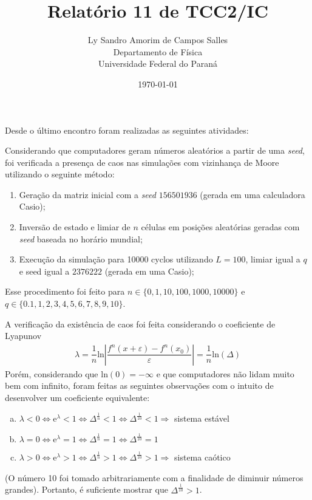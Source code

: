 \documentclass[12pt,a4paper,final]{article}
\title{Relatório 11 de TCC2/IC}
\author{Ly Sandro Amorim de Campos Salles\\Departamento de Física\\Universidade Federal do Paraná}
\date{\today}
\begin{document}
	\maketitle

  Desde o último encontro foram realizadas as seguintes atividades:

  Considerando que computadores geram números aleatórios a partir de uma \textit{seed}, foi verificada a presença de caos nas simulações com vizinhança de Moore utilizando o seguinte método:
  \begin{enumerate}
    \item Geração da matriz inicial com a \textit{seed} $156501936$ (gerada em uma calculadora Casio);
    \item Inversão de estado e limiar de $n$ células em posições aleatórias geradas com \textit{seed} baseada no horário mundial;
    \item Execução da simulação para 10000 cyclos utilizando $L=100$, limiar igual a $q$ e seed igual a $2376222$ (gerada em uma Casio);
  \end{enumerate}
  Esse procedimento foi feito para $n\in\{0, 1, 10, 100, 1000, 10000\}$ e $q\in\{0.1, 1, 2, 3, 4, 5, 6, 7, 8, 9, 10\}$.

  A verificação da existência de caos foi feita considerando o coeficiente de Lyapunov
  \begin{align}
    \lambda = \dfrac{1}{n} \mathrm{ln}\left|\dfrac{f^n(x+\varepsilon) - f^n(x_0)}{\varepsilon}\right| = \dfrac{1}{n} \mathrm{ln}(\Delta)
  \end{align}
  Porém, considerando que $\mathrm{ln}(0)=-\infty$ e que computadores não lidam muito bem com infinito, foram feitas as seguintes observações com o intuito de desenvolver um coeficiente equivalente:
  \begin{enumerate}[a)]
    \item $\lambda < 0 \Leftrightarrow \mathrm{e}^\lambda < 1 \Leftrightarrow \Delta^\frac{1}{n} < 1 \Leftrightarrow \Delta^\frac{1}{10} < 1 \Rightarrow$ sistema estável
    \item $\lambda = 0 \Leftrightarrow \mathrm{e}^\lambda = 1 \Leftrightarrow \Delta^\frac{1}{n} = 1 \Leftrightarrow \Delta^\frac{1}{10} = 1$
    \item $\lambda > 0 \Leftrightarrow \mathrm{e}^\lambda > 1 \Leftrightarrow \Delta^\frac{1}{n} > 1 \Leftrightarrow \Delta^\frac{1}{10} > 1 \Rightarrow$ sistema caótico
  \end{enumerate}
 (O número 10 foi tomado arbitrariamente com a finalidade de diminuir números grandes). Portanto, é suficiente mostrar que $\Delta^\frac{1}{10} > 1$.
\end{document}
